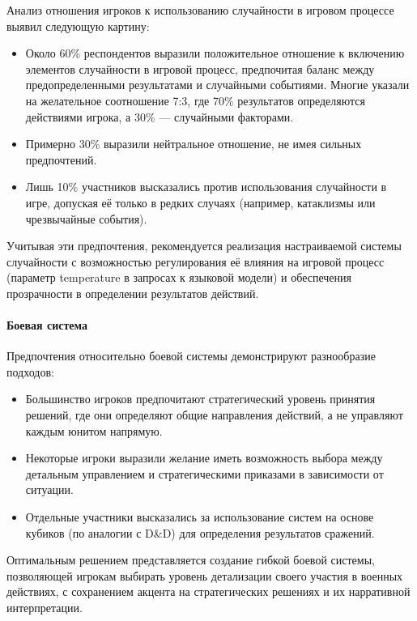 Анализ отношения игроков к использованию случайности в игровом процессе выявил следующую картину:

\begin{itemize}
    \item Около 60\% респондентов выразили положительное отношение к включению элементов случайности в игровой процесс, предпочитая баланс между предопределенными результатами и случайными событиями. Многие указали на желательное соотношение 7:3, где 70\% результатов определяются действиями игрока, а 30\% — случайными факторами.

    \item Примерно 30\% выразили нейтральное отношение, не имея сильных предпочтений.

    \item Лишь 10\% участников высказались против использования случайности в игре, допуская её только в редких случаях (например, катаклизмы или чрезвычайные события).
\end{itemize}

Учитывая эти предпочтения, рекомендуется реализация настраиваемой системы случайности с возможностью регулирования её влияния на игровой процесс (параметр temperature в запросах к языковой модели) и обеспечения прозрачности в определении результатов действий.

\paragraph{Боевая система}

Предпочтения относительно боевой системы демонстрируют разнообразие подходов:

\begin{itemize}
    \item Большинство игроков предпочитают стратегический уровень принятия решений, где они определяют общие направления действий, а не управляют каждым юнитом напрямую.

    \item Некоторые игроки выразили желание иметь возможность выбора между детальным управлением и стратегическими приказами в зависимости от ситуации.

    \item Отдельные участники высказались за использование систем на основе кубиков (по аналогии с D\&D) для определения результатов сражений.
\end{itemize}

Оптимальным решением представляется создание гибкой боевой системы, позволяющей игрокам выбирать уровень детализации своего участия в военных действиях, с сохранением акцента на стратегических решениях и их нарративной интерпретации.

